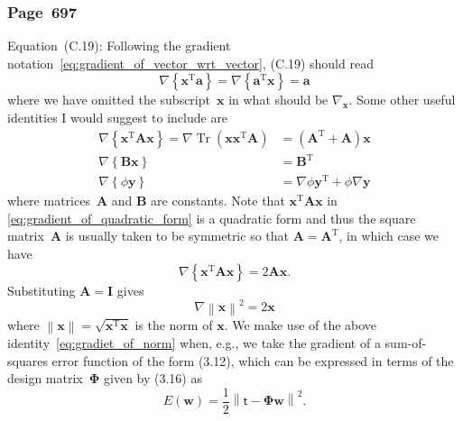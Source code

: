 \documentclass[12pt,a4paper]{article}
\newcommand{\erratum}[1]{%
\subsubsection*{#1}
\addcontentsline{toc}{subsection}{#1}}
\begin{document}
\erratum{Page~697}
Equation~(C.19):
Following the gradient notation~\eqref{eq:gradient_of_vector_wrt_vector}, (C.19) should read
\begin{equation}
\nabla \left\{ \mathbf{x}^{\operatorname{T}} \mathbf{a} \right\} = 
\nabla \left\{ \mathbf{a}^{\operatorname{T}} \mathbf{x} \right\} = 
\mathbf{a}
\end{equation}
where we have omitted the subscript~$\mathbf{x}$ in what should be $\nabla_{\mathbf{x}}$.
Some other useful identities I would suggest to include are
\begin{align}
\nabla \left\{ \mathbf{x}^{\operatorname{T}} \mathbf{A} \mathbf{x} \right\} =
\nabla \operatorname{Tr}\left(\mathbf{x}\mathbf{x}^{\operatorname{T}}\mathbf{A}\right) &=
\left( \mathbf{A}^{\operatorname{T}} + \mathbf{A} \right)\mathbf{x}
\label{eq:gradient_of_quadratic_form} \\
\nabla \left\{ \mathbf{B}\mathbf{x} \right\} & = \mathbf{B}^{\operatorname{T}}
\label{eq:gradient_of_matrix_vector_product} \\
\nabla \left\{ \phi\mathbf{y} \right\} &=
\nabla\phi \mathbf{y}^{\operatorname{T}} + \phi \nabla\mathbf{y}
\label{eq:gradient_of_scalar_vector_product}
\end{align}
where matrices~$\mathbf{A}$ and $\mathbf{B}$ are constants.
Note that $\mathbf{x}^{\operatorname{T}} \mathbf{A} \mathbf{x}$ in
\eqref{eq:gradient_of_quadratic_form} is a quadratic form and thus
the square matrix~$\mathbf{A}$ is usually taken to be symmetric so that
$\mathbf{A} = \mathbf{A}^{\operatorname{T}}$, in which case we have
\begin{equation}
\nabla \left\{ \mathbf{x}^{\operatorname{T}} \mathbf{A} \mathbf{x} \right\} =
2\mathbf{A} \mathbf{x} \label{eq:gradient_of_quadratic_form_symmetric} .
\end{equation}
Substituting $\mathbf{A} = \mathbf{I}$ gives
\begin{equation}
\nabla \left\| \mathbf{x} \right\|^{2} = 2\mathbf{x} \label{eq:gradiet_of_norm}
\end{equation}
where $\left\| \mathbf{x} \right\| = \sqrt{\mathbf{x}^{\operatorname{T}}\mathbf{x}}$ is
the norm of $\mathbf{x}$.
We make use of the above identity~\eqref{eq:gradiet_of_norm} when, e.g., we take the gradient of
a sum-of-squares error function of the form (3.12),
which can be expressed in terms of the design matrix~$\bm{\Phi}$ given by (3.16) as
\begin{equation}
E(\mathbf{w}) = \frac{1}{2} \left\| \bm{\mathsf{t}} - \bm{\Phi}\mathbf{w} \right\|^2
\label{eq:sum_of_squares_error} .
\end{equation}
\end{document}
